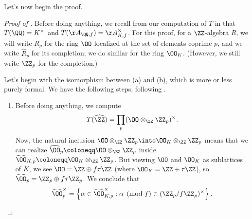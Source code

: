 \documentclass[../notes.tex]{subfiles}
\begin{document}
Let's now begin the proof.
\begin{proof}[Proof of ]
	Before doing anything, we recall from our computation of $T$ in  that $T(\QQ)=K^\times$ and $T(\AA_{\QQ,f})=\AA_{K,f}^\times$. For this proof, for a $\ZZ$-algebra $R$, we will write $R_p$ for the ring $\OO$ localized at the set of elements coprime $p$, and we write $\widehat R_p$ for its completion; we do similar for the ring $\OO_K$. (However, we still write $\ZZ_p$ for the completion.)
	
	Let's begin with the isomorphism between (a) and (b), which is more or less purely formal. We have the following steps, following .
	\begin{enumerate}
		\item Before doing anything, we compute
		\[T(\widehat\ZZ)=\prod_p(\OO\otimes_\ZZ\ZZ_p)^\times.\]
		Now, the natural inclusion $\OO\otimes_\ZZ\ZZ_p\into\OO_K\otimes_\ZZ\ZZ_p$ means that we can realize $\widehat\OO_p\coloneqq\OO\otimes_\ZZ\ZZ_p$ inside $\widehat\OO_{K,p}\coloneqq\OO_K\otimes_\ZZ\ZZ_p$. But viewing $\OO$ and $\OO_K$ as sublattices of $K$, we see $\OO=\ZZ\oplus f\tau\ZZ$ (where $\OO_K=\ZZ+\tau\ZZ$), so $\widehat\OO_p=\ZZ_p\oplus f\tau\ZZ_p$. We conclude that
		\[\widehat\OO_p^\times=\left\{\alpha\in\widehat\OO_{K,p}^\times:\alpha\pmod f\in(\ZZ_p/f\ZZ_p)^\times\right\}.\]


\end{enumerate}
\end{proof}
\end{document}
